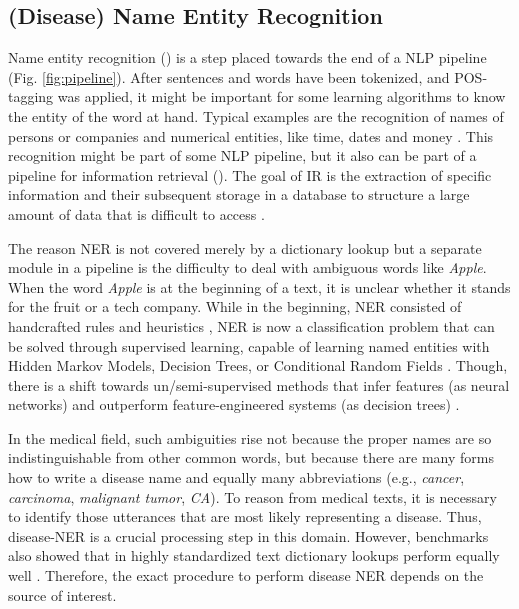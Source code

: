 \subsection{(Disease) Name Entity Recognition}
Name entity recognition () is a step placed towards the end of a NLP pipeline (Fig. \ref{fig:pipeline}).
After sentences and words have been tokenized, and POS-tagging was applied, it might be important for some learning algorithms to know the entity of the word at hand.
Typical examples are the recognition of names of persons or companies and numerical entities, like time, dates and money \citep{Nadeau2009}.
This recognition might be part of some NLP pipeline, but it also can be part of a pipeline for information retrieval ().
The goal of IR is the extraction of specific information and their subsequent storage in a database to structure a large amount of data that is difficult to access \citep{Manning2008, Wei2011}.

The reason NER is not covered merely by a dictionary lookup but a separate module in a pipeline is the difficulty to deal with ambiguous words like \textit{Apple}.
When the word \textit{Apple} is at the beginning of a text, it is unclear whether it stands for the fruit or a tech company.
While in the beginning, NER consisted of handcrafted rules and heuristics \citep{Rau1991}, NER is now a classification problem that can be solved through supervised learning, capable of learning named entities with Hidden Markov Models, Decision Trees, or Conditional Random Fields \citep{Nadeau2009}.
Though, there is a shift towards un/semi-supervised methods that infer features (as neural networks) and outperform feature-engineered systems (as decision trees) \citep{Yadav2018}.

In the medical field, such ambiguities rise not because the proper names are so indistinguishable from other common words, but because there are many forms how to write a disease name and equally many abbreviations (e.g., \textit{cancer}, \textit{carcinoma}, \textit{malignant tumor}, \textit{CA}).
To reason from medical texts, it is necessary to identify those utterances that are most likely representing a disease.
Thus, disease-NER is a crucial processing step in this domain.
However, benchmarks also showed that in highly standardized text dictionary lookups perform equally well \citep{Jimeno2007}.
Therefore, the exact procedure to perform disease NER depends on the source of interest.

